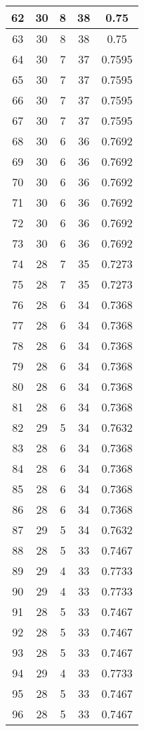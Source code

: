 \documentclass[letterpaper, 12pt]{article}
\begin{document}
\begin{longtable}{|c|c|c|c|c|}
\hline
62 & 30 & 8 & 38 & 0.75 \\
\hline
63 & 30 & 8 & 38 & 0.75 \\
\hline
64 & 30 & 7 & 37 & 0.7595 \\
\hline
65 & 30 & 7 & 37 & 0.7595 \\
\hline
66 & 30 & 7 & 37 & 0.7595 \\
\hline
67 & 30 & 7 & 37 & 0.7595 \\
\hline
68 & 30 & 6 & 36 & 0.7692 \\
\hline
69 & 30 & 6 & 36 & 0.7692 \\
\hline
70 & 30 & 6 & 36 & 0.7692 \\
\hline
71 & 30 & 6 & 36 & 0.7692 \\
\hline
72 & 30 & 6 & 36 & 0.7692 \\
\hline
73 & 30 & 6 & 36 & 0.7692 \\
\hline
74 & 28 & 7 & 35 & 0.7273 \\
\hline
75 & 28 & 7 & 35 & 0.7273 \\
\hline
76 & 28 & 6 & 34 & 0.7368 \\
\hline
77 & 28 & 6 & 34 & 0.7368 \\
\hline
78 & 28 & 6 & 34 & 0.7368 \\
\hline
79 & 28 & 6 & 34 & 0.7368 \\
\hline
80 & 28 & 6 & 34 & 0.7368 \\
\hline
81 & 28 & 6 & 34 & 0.7368 \\
\hline
82 & 29 & 5 & 34 & 0.7632 \\
\hline
83 & 28 & 6 & 34 & 0.7368 \\
\hline
84 & 28 & 6 & 34 & 0.7368 \\
\hline
85 & 28 & 6 & 34 & 0.7368 \\
\hline
86 & 28 & 6 & 34 & 0.7368 \\
\hline
87 & 29 & 5 & 34 & 0.7632 \\
\hline
88 & 28 & 5 & 33 & 0.7467 \\
\hline
89 & 29 & 4 & 33 & 0.7733 \\
\hline
90 & 29 & 4 & 33 & 0.7733 \\
\hline
91 & 28 & 5 & 33 & 0.7467 \\
\hline
92 & 28 & 5 & 33 & 0.7467 \\
\hline
93 & 28 & 5 & 33 & 0.7467 \\
\hline
94 & 29 & 4 & 33 & 0.7733 \\
\hline
95 & 28 & 5 & 33 & 0.7467 \\
\hline
96 & 28 & 5 & 33 & 0.7467 \\

\end{longtable}
\end{document}

